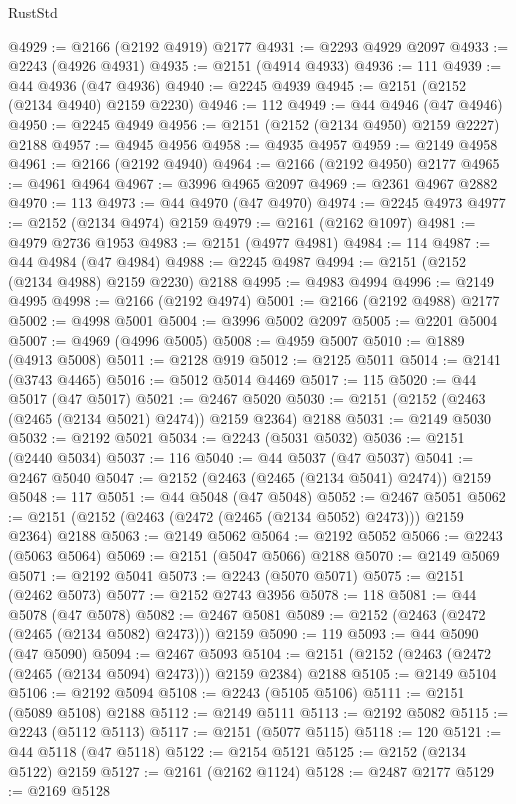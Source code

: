 \begin{lexlean}{RustStd}
\begin{coremodule}
@4929 := @2166 (@2192 @4919) @2177
@4931 := @2293 @4929 @2097
@4933 := @2243 (@4926 @4931)
@4935 := @2151 (@4914 @4933)
@4936 := 111
@4939 := @44 @4936 (@47 @4936)
@4940 := @2245 @4939
@4945 := @2151 (@2152 (@2134 @4940) @2159 @2230)
@4946 := 112
@4949 := @44 @4946 (@47 @4946)
@4950 := @2245 @4949
@4956 := @2151 (@2152 (@2134 @4950) @2159 @2227) @2188
@4957 := @4945 @4956
@4958 := @4935 @4957
@4959 := @2149 @4958
@4961 := @2166 (@2192 @4940)
@4964 := @2166 (@2192 @4950) @2177
@4965 := @4961 @4964
@4967 := @3996 @4965 @2097
@4969 := @2361 @4967 @2882
@4970 := 113
@4973 := @44 @4970 (@47 @4970)
@4974 := @2245 @4973
@4977 := @2152 (@2134 @4974) @2159
@4979 := @2161 (@2162 @1097)
@4981 := @4979 @2736 @1953
@4983 := @2151 (@4977 @4981)
@4984 := 114
@4987 := @44 @4984 (@47 @4984)
@4988 := @2245 @4987
@4994 := @2151 (@2152 (@2134 @4988) @2159 @2230) @2188
@4995 := @4983 @4994
@4996 := @2149 @4995
@4998 := @2166 (@2192 @4974)
@5001 := @2166 (@2192 @4988) @2177
@5002 := @4998 @5001
@5004 := @3996 @5002 @2097
@5005 := @2201 @5004
@5007 := @4969 (@4996 @5005)
@5008 := @4959 @5007
@5010 := @1889 (@4913 @5008)
@5011 := @2128 @919
@5012 := @2125 @5011
@5014 := @2141 (@3743 @4465)
@5016 := @5012 @5014 @4469
@5017 := 115
@5020 := @44 @5017 (@47 @5017)
@5021 := @2467 @5020
@5030 := @2151 (@2152 (@2463 (@2465 (@2134 @5021) @2474)) @2159 @2364) @2188
@5031 := @2149 @5030
@5032 := @2192 @5021
@5034 := @2243 (@5031 @5032)
@5036 := @2151 (@2440 @5034)
@5037 := 116
@5040 := @44 @5037 (@47 @5037)
@5041 := @2467 @5040
@5047 := @2152 (@2463 (@2465 (@2134 @5041) @2474)) @2159
@5048 := 117
@5051 := @44 @5048 (@47 @5048)
@5052 := @2467 @5051
@5062 := @2151 (@2152 (@2463 (@2472 (@2465 (@2134 @5052) @2473))) @2159 @2364) @2188
@5063 := @2149 @5062
@5064 := @2192 @5052
@5066 := @2243 (@5063 @5064)
@5069 := @2151 (@5047 @5066) @2188
@5070 := @2149 @5069
@5071 := @2192 @5041
@5073 := @2243 (@5070 @5071)
@5075 := @2151 (@2462 @5073)
@5077 := @2152 @2743 @3956
@5078 := 118
@5081 := @44 @5078 (@47 @5078)
@5082 := @2467 @5081
@5089 := @2152 (@2463 (@2472 (@2465 (@2134 @5082) @2473))) @2159
@5090 := 119
@5093 := @44 @5090 (@47 @5090)
@5094 := @2467 @5093
@5104 := @2151 (@2152 (@2463 (@2472 (@2465 (@2134 @5094) @2473))) @2159 @2384) @2188
@5105 := @2149 @5104
@5106 := @2192 @5094
@5108 := @2243 (@5105 @5106)
@5111 := @2151 (@5089 @5108) @2188
@5112 := @2149 @5111
@5113 := @2192 @5082
@5115 := @2243 (@5112 @5113)
@5117 := @2151 (@5077 @5115)
@5118 := 120
@5121 := @44 @5118 (@47 @5118)
@5122 := @2154 @5121
@5125 := @2152 (@2134 @5122) @2159
@5127 := @2161 (@2162 @1124)
@5128 := @2487 @2177
@5129 := @2169 @5128

\end{coremodule}
\end{lexlean}
